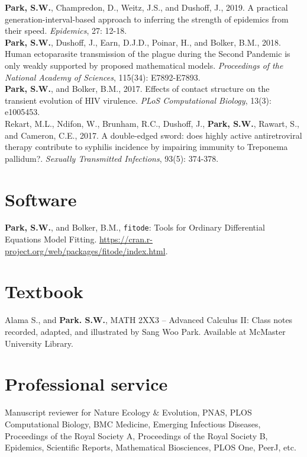 \documentclass[11pt]{article} %
\begin{document}
 \textbf{Park, S.W.}, Champredon, D., Weitz, J.S., and Dushoff, J., 2019. A practical generation-interval-based approach to inferring the strength of epidemics from their speed. \textit{Epidemics}, 27: 12-18.\\

 \textbf{Park, S.W.}, Dushoff, J., Earn, D.J.D., Poinar, H., and Bolker, B.M., 2018. Human
ectoparasite transmission of the plague during the Second Pandemic is only weakly
supported by proposed mathematical models. \textit{Proceedings of the National Academy of Sciences}, 115(34): E7892-E7893.\\

 \textbf{Park, S.W.}, and Bolker, B.M., 2017. Effects of contact structure on the transient
evolution of HIV virulence. \textit{PLoS Computational Biology}, 13(3): e1005453.\\

 Rekart, M.L., Ndifon, W., Brunham, R.C., Dushoff, J., \textbf{Park, S.W.}, Rawart, S., and
Cameron, C.E., 2017. A double-edged sword: does highly active antiretroviral therapy contribute to syphilis incidence by impairing immunity to Treponema pallidum?.
\textit{Sexually Transmitted Infections}, 93(5): 374-378.\\

\section*{Software}

 \textbf{Park, S.W.}, and Bolker, B.M., \texttt{fitode}: Tools for Ordinary Differential Equations Model Fitting. \url{https://cran.r-project.org/web/packages/fitode/index.html}.

\section*{Textbook}

 Alama S., and \textbf{Park. S.W.}, MATH 2XX3 -- Advanced Calculus II: Class notes recorded, adapted, and illustrated by Sang Woo Park. Available at McMaster University Library.

\section*{Professional service}

Manuscript reviewer for Nature Ecology \& Evolution, PNAS, PLOS Computational Biology, BMC Medicine, Emerging Infectious Diseases, Proceedings of the Royal Society A, Proceedings of the Royal Society B, Epidemics, Scientific Reports, Mathematical Biosciences, PLOS One, PeerJ, etc.\\
\end{document}

